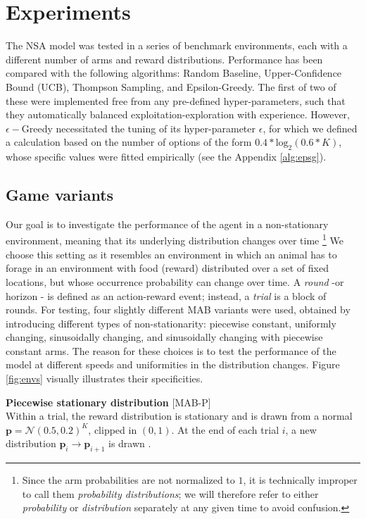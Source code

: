 \section{Experiments}

The NSA model was tested in a series of benchmark environments, each with a different number of arms and reward distributions. Performance has been compared with the following algorithms: Random Baseline, Upper-Confidence Bound (UCB), Thompson Sampling, and Epsilon-Greedy.
The first of two of these were implemented free from any pre-defined hyper-parameters, such that they automatically balanced exploitation-exploration with experience.
However, $\epsilon-$Greedy necessitated the tuning of its hyper-parameter $\epsilon$, for which we defined a calculation based on the number of options of the form $0.4*\text{log}_{2}(0.6*K)$, whose specific values were fitted empirically (see the Appendix \ref{alg:epsg}).

\subsection{Game variants}\label{sec:envs}

\noindent Our goal is to investigate the performance of the agent in a non-stationary environment, meaning that its underlying distribution changes over time \footnote{Since the arm probabilities are not normalized to $1$, it is technically improper to call them \textit{probability distributions}; we will therefore refer to either \textit{probability} or \textit{distribution} separately at any given time to avoid confusion.}
We choose this setting as it resembles an environment in which an animal has to forage in an environment with food (reward) distributed over a set of fixed locations, but whose occurrence probability can change over time.
A \textit{round} -or horizon - is defined as an action-reward event; instead, a \textit{trial} is a block of rounds.
For testing, four slightly different MAB variants were used, obtained by introducing different types of non-stationarity: piecewise constant, uniformly changing, sinusoidally changing, and sinusoidally changing with piecewise constant arms.
The reason for these choices is to test the performance of the model at different speeds and uniformities in the distribution changes.
Figure \ref{fig:envs} visually illustrates their specificities.

\hfill \break
\noindent \textbf{Piecewise stationary distribution} [\textsc{MAB-P}]\\
Within a trial, the reward distribution is stationary and is drawn from a normal $\mathbf{p}=\mathcal{N}(0.5, 0.2)^{K}$, clipped in $(0, 1)$.
At the end of each trial $i$, a new distribution $\mathbf{\mathbf{p}}_{i} \to \mathbf{\mathbf{p}}_{i+1}$ is drawn \cite{qiForcedExplorationBandit2023}.

